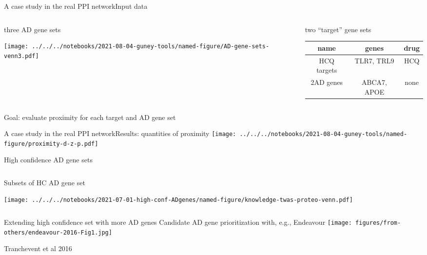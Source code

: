 \documentclass{beamer}
\begin{document}
\begin{frame}{A case study in the real PPI network}{Input data}
\begin{columns}[t]
\begin{column}{0.5\textwidth}

\begin{center}
three AD gene sets
\end{center}

\texttt{[image: ../../../notebooks/2021-08-04-guney-tools/named-figure/AD-gene-sets-venn3.pdf]}
\end{column}

\begin{column}{0.5\textwidth}

\begin{center}
two ``target'' gene sets
\end{center}
	\footnotesize
\begin{tabular}{|c|c|c|}
\hline
name & genes & drug \\
\hline
HCQ targets & TLR7, TRL9 & HCQ \\
2AD genes & ABCA7, APOE  & none \\
\hline
\end{tabular}
\end{column}
\end{columns}
\begin{center}
Goal: evaluate proximity for each target and AD gene set
\end{center}
\end{frame}

\begin{frame}{A case study in the real PPI network}{Results: quantities of proximity}
\texttt{[image: ../../../notebooks/2021-08-04-guney-tools/named-figure/proximity-d-z-p.pdf]}
\end{frame}

\begin{frame}{High confidence AD gene sets}
\begin{columns}[t]
\begin{column}{0.5\textwidth}
Subsets of HC AD gene set

\texttt{[image: ../../../notebooks/2021-07-01-high-conf-ADgenes/named-figure/knowledge-twas-proteo-venn.pdf]}
\end{column}

\begin{column}{0.5\textwidth}

\end{column}
\end{columns}
\end{frame}

\begin{frame}{Extending high confidence set with more AD genes}
	{Candidate AD gene prioritization with, e.g., Endeavour}
\texttt{[image: figures/from-others/endeavour-2016-Fig1.jpg]}

\vfill
\tiny Tranchevent et al 2016
\end{frame}
\end{document}
